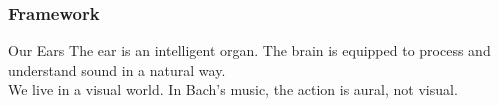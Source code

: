 	\begin{frame}
		\frametitle{Framework}
		\begin{block}{Our Ears}
			The ear is an intelligent organ. The brain is equipped to process and understand sound in a natural way.\\
			We live in a visual world.
			In Bach's music, the action is aural, not visual.
		\end{block}
	\end{frame}
